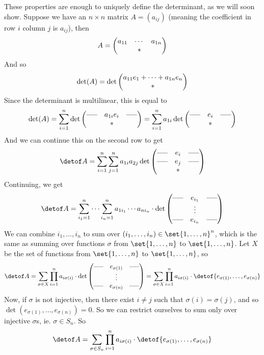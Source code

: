 These properties are enough to uniquely define the determinant, as we will soon show.
Suppose we have an $n\times n$ matrix $A=(a_{ij})$ (meaning the coefficient in row $i$ column $j$ is $a_{ij}$), then
\[ A = \begin{pmatrix}a_{11} & \cdots & a_{1n} \\ & * &\end{pmatrix} \]
And so
\[ \det(A) = \det\begin{pmatrix}a_{11}e_1 + \cdots + a_{1n}e_n \\ *\end{pmatrix} \]
Since the determinant is multilinear, this is equal to
\[ \det(A) = \sum_{i=1}^n\det\pmat{\hort & a_{1i}e_i & \hort \\ &*&} = \sum_{i=1}^n a_{1i}\det\pmat{\hort & e_i & \hort \\ &*&} \]
And we can continue this on the second row to get
\[ \detof A = \sum_{i=1}^n\sum_{j=1}^n a_{1i}a_{2j}\det\pmat{\hort & e_i & \hort \\ \hort & e_j & \hort \\ &*&} \]
Continuing, we get
\[ \detof A = \sum_{i_1=1}^n\cdots\sum_{i_n=1}^n a_{1i_1}\cdots a_{ni_n}\cdot\det\pmat{\hort & e_{i_1} & \hort \\ & \vdots & \\ \hort & e_{i_n} & \hort} \]
We can combine $i_1,\dots,i_n$ to sum over $(i_1,\dots,i_n)\in\set{1,\dots,n}^n$, which is the same as summing over functions $\sigma$ from $\set{1,\dots,n}$ to $\set{1,\dots,n}$.
Let $X$ be the set of functions from $\set{1,\dots,n}$ to $\set{1,\dots,n}$, so
\[ \detof A = \sum_{\sigma\in X}\prod_{i=1}^n a_{i\sigma(i)}\cdot\det\pmat{\hort & e_{\sigma(1)} & \hort \\ & \vdots & \\ \hort & e_{\sigma(n)} & \hort} =
\sum_{\sigma\in X}\prod_{i=1}^n a_{i\sigma(i)}\cdot\detof{e_{\sigma(1)},\dots,e_{\sigma(n)}} \]
Now, if $\sigma$ is not injective, then there exist $i\neq j$ such that $\sigma(i)=\sigma(j)$, and so $\det(e_{\sigma(1)},\dots,e_{\sigma(n)})=0$.
So we can restrict ourselves to sum only over injective $\sigma$s, ie. $\sigma\in S_n$.
So
\[ \detof A = \sum_{\sigma\in S_n}\prod_{i=1}^n a_{i\sigma(i)}\cdot\detof{e_{\sigma(1)},\dots,e_{\sigma(n)}} \]

